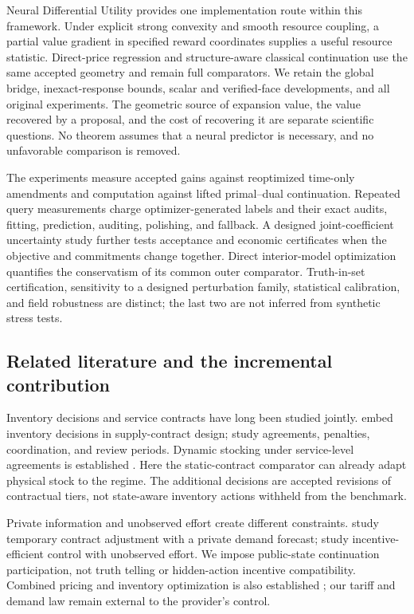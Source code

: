 \documentclass[11pt,letterpaper]{article}
\theoremstyle{definition}
\newcommand{\1}{\mathbf 1}
\begin{document}
Neural Differential Utility provides one implementation route within this
framework. Under explicit strong convexity and smooth resource coupling, a
partial value gradient in specified reward coordinates supplies a useful
resource statistic. Direct-price regression and structure-aware classical
continuation use the same accepted geometry and remain full comparators. We
retain the global bridge, inexact-response bounds, scalar and verified-face
developments, and all original experiments. The geometric source of expansion
value, the value recovered by a proposal, and the cost of recovering it are
separate scientific questions. No theorem assumes that a neural predictor is
necessary, and no unfavorable comparison is removed.

The experiments measure accepted gains against reoptimized time-only
amendments and computation against lifted primal--dual continuation. Repeated
query measurements charge optimizer-generated labels and their exact audits, fitting, prediction, auditing,
polishing, and fallback. A designed joint-coefficient uncertainty study further
tests acceptance and economic certificates when the objective and commitments
change together. Direct interior-model optimization quantifies the conservatism
of its common outer comparator. Truth-in-set certification, sensitivity to a
designed perturbation family, statistical calibration, and field robustness are
distinct; the last two are not inferred from synthetic stress tests.

\subsection{Related literature and the incremental contribution}
Inventory decisions and service contracts have long been studied jointly. \citet{Henig1997} embed inventory decisions in supply-contract design; \citet{LiangAtkins2013,Sieke2012,Katok2008} study agreements, penalties, coordination, and review periods. Dynamic stocking under service-level agreements is established \citep{Hosseinifard2022,Caggiano2007,Abbasi2022}. Here the static-contract comparator can already adapt physical stock to the regime. The additional decisions are accepted revisions of contractual tiers, not state-aware inventory actions withheld from the benchmark.

Private information and unobserved effort create different constraints. \citet{NasserTurcic2019} study temporary contract adjustment with a private demand forecast; \citet{PlambeckZenios2003} study incentive-efficient control with unobserved effort. We impose public-state continuation participation, not truth telling or hidden-action incentive compatibility. Combined pricing and inventory optimization is also established \citep{FedergruenHeching1999}; our tariff and demand law remain external to the provider's control.
\end{document}
